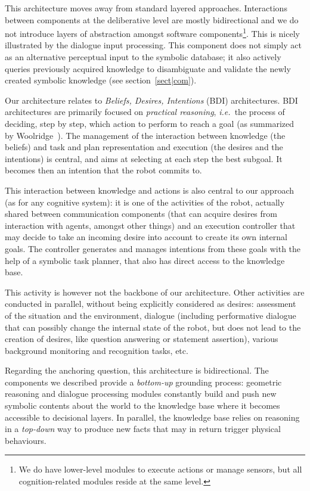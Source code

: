 \documentclass[preprint,12pt]{elsarticle}
\newcommand{\ie}{{\textit{i.e.\ }}}
\begin{document}
This architecture moves away from standard layered approaches. Interactions
between components at the deliberative level are mostly bidirectional and we do
not introduce layers of abstraction amongst software components\footnote{We do
have lower-level modules to execute actions or manage sensors, but all
cognition-related modules reside at the same level.}. This is nicely
illustrated by the dialogue input processing. This component does not simply
act as an alternative perceptual input to the symbolic database; it also
actively queries previously acquired knowledge to disambiguate and validate the
newly created symbolic knowledge (see section~\ref{sect|com}).

Our architecture relates to \emph{Beliefs, Desires, Intentions} (BDI)
architectures. BDI architectures are primarily focused on \emph{practical
reasoning}, \ie the process of deciding, step by step, which action to perform
to reach a goal (as summarized by Woolridge~\cite{Woolridge1999}). The
management of the interaction between knowledge (the beliefs) and task and plan
representation and execution (the desires and the intentions) is central, and
aims at selecting at each step the best subgoal. It becomes then an intention
that the robot commits to.

This interaction between knowledge and actions is also central to our approach
(as for any cognitive system): it is one of the activities of the
robot, actually shared between communication components (that can acquire
desires from interaction with agents, amongst other things) and an execution
controller that may decide to take an incoming desire into account to create
its own internal goals. The controller generates and manages intentions from
these goals with the help of a symbolic task planner, that also has direct
access to the knowledge base.

This activity is however not the backbone of our architecture. Other
activities are conducted in parallel, without being explicitly considered as
desires: assessment of the situation and the environment, dialogue (including
performative dialogue that can possibly change the internal state of the robot,
but does not lead to the creation of desires, like question answering or
statement assertion), various background monitoring and recognition tasks, etc.

Regarding the anchoring question, this architecture is bidirectional. The
components we described provide a \textit{bottom-up} grounding process:
geometric reasoning and dialogue processing modules constantly build and push
new symbolic contents about the world to the knowledge base where it becomes
accessible to decisional layers. In parallel, the knowledge base relies on
reasoning in a \textit{top-down} way to produce new facts that may in return
trigger physical behaviours.
\end{document}
